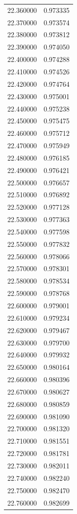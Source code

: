 \begin{tabular}{rr}
22.360000 & 0.973335 \\
22.370000 & 0.973574 \\
22.380000 & 0.973812 \\
22.390000 & 0.974050 \\
22.400000 & 0.974288 \\
22.410000 & 0.974526 \\
22.420000 & 0.974764 \\
22.430000 & 0.975001 \\
22.440000 & 0.975238 \\
22.450000 & 0.975475 \\
22.460000 & 0.975712 \\
22.470000 & 0.975949 \\
22.480000 & 0.976185 \\
22.490000 & 0.976421 \\
22.500000 & 0.976657 \\
22.510000 & 0.976892 \\
22.520000 & 0.977128 \\
22.530000 & 0.977363 \\
22.540000 & 0.977598 \\
22.550000 & 0.977832 \\
22.560000 & 0.978066 \\
22.570000 & 0.978301 \\
22.580000 & 0.978534 \\
22.590000 & 0.978768 \\
22.600000 & 0.979001 \\
22.610000 & 0.979234 \\
22.620000 & 0.979467 \\
22.630000 & 0.979700 \\
22.640000 & 0.979932 \\
22.650000 & 0.980164 \\
22.660000 & 0.980396 \\
22.670000 & 0.980627 \\
22.680000 & 0.980859 \\
22.690000 & 0.981090 \\
22.700000 & 0.981320 \\
22.710000 & 0.981551 \\
22.720000 & 0.981781 \\
22.730000 & 0.982011 \\
22.740000 & 0.982240 \\
22.750000 & 0.982470 \\
22.760000 & 0.982699 \\

\end{tabular}
